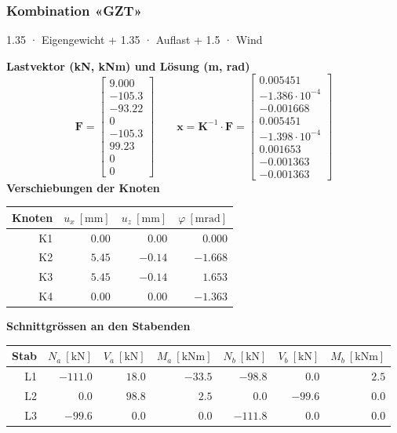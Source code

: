 \documentclass[11pt,a4paper]{article}
\begin{document}
\subsubsection{Kombination «GZT»}
1.35 · Eigengewicht + 1.35 · Auflast + 1.5 · Wind

\noindent\textbf{Lastvektor (kN, kNm) und Lösung (m, rad)}
\begin{equation*}
\mathbf{F} = \begin{bmatrix} 9.000 \\ -105.3 \\ -93.22 \\ 0 \\ -105.3 \\ 99.23 \\ 0 \\ 0 \end{bmatrix} \qquad \mathbf{x} = \mathbf{K}^{-1} \cdot \mathbf{F} = \begin{bmatrix} 0.005451 \\ -1.386 \cdot 10^{-4} \\ -0.001668 \\ 0.005451 \\ -1.398 \cdot 10^{-4} \\ 0.001653 \\ -0.001363 \\ -0.001363 \end{bmatrix}
\end{equation*}
\noindent\textbf{Verschiebungen der Knoten}
\begin{longtable}{rrrr}
\hline
Knoten & $u_x\ [\mathrm{mm}]$ & $u_z\ [\mathrm{mm}]$ & $\varphi\ [\mathrm{mrad}]$ \\
\hline
\endhead
K1 & $0.00$ & $0.00$ & $0.000$ \\
K2 & $5.45$ & $-0.14$ & $-1.668$ \\
K3 & $5.45$ & $-0.14$ & $1.653$ \\
K4 & $0.00$ & $0.00$ & $-1.363$ \\
\hline
\end{longtable}
\noindent\textbf{Schnittgrössen an den Stabenden}
\begin{longtable}{rrrrrrr}
\hline
Stab & $N_{a}\ [\mathrm{kN}]$ & $V_{a}\ [\mathrm{kN}]$ & $M_{a}\ [\mathrm{kNm}]$ & $N_{b}\ [\mathrm{kN}]$ & $V_{b}\ [\mathrm{kN}]$ & $M_{b}\ [\mathrm{kNm}]$ \\
\hline
\endhead
L1 & $-111.0$ & $18.0$ & $-33.5$ & $-98.8$ & $0.0$ & $2.5$ \\
L2 & $0.0$ & $98.8$ & $2.5$ & $0.0$ & $-99.6$ & $0.0$ \\
L3 & $-99.6$ & $0.0$ & $0.0$ & $-111.8$ & $0.0$ & $0.0$ \\
\hline
\end{longtable}
\end{document}
